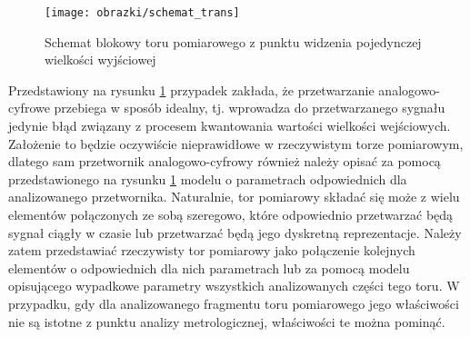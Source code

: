 \begin{figure}[htb!]
\begin{center}
\texttt{[image: obrazki/schemat\_trans]}
\caption{Schemat blokowy toru pomiarowego z punktu widzenia pojedynczej wielkości wyjściowej \label{fig_chain_trans}}
\end{center}
\end{figure}

Przedstawiony na rysunku \ref{fig_chain_trans} przypadek zakłada, że przetwarzanie analogowo-cyfrowe przebiega w sposób idealny, tj. wprowadza do przetwarzanego sygnału jedynie błąd związany z procesem kwantowania wartości wielkości wejściowych. Założenie to będzie oczywiście nieprawidłowe w rzeczywistym torze pomiarowym, dlatego sam przetwornik analogowo-cyfrowy również należy opisać za pomocą przedstawionego na rysunku \ref{fig_chain_trans} modelu o parametrach odpowiednich dla analizowanego przetwornika. Naturalnie, tor pomiarowy składać się może z wielu elementów połączonych ze sobą szeregowo, które odpowiednio przetwarzać będą sygnał ciągły w czasie lub przetwarzać będą jego dyskretną reprezentacje. Należy zatem przedstawiać rzeczywisty tor pomiarowy jako połączenie kolejnych elementów o odpowiednich dla nich parametrach lub za pomocą modelu opisującego wypadkowe parametry wszystkich analizowanych części tego toru. W przypadku, gdy dla analizowanego fragmentu toru pomiarowego jego właściwości nie są istotne z punktu analizy metrologicznej, właściwości te można pominąć.

